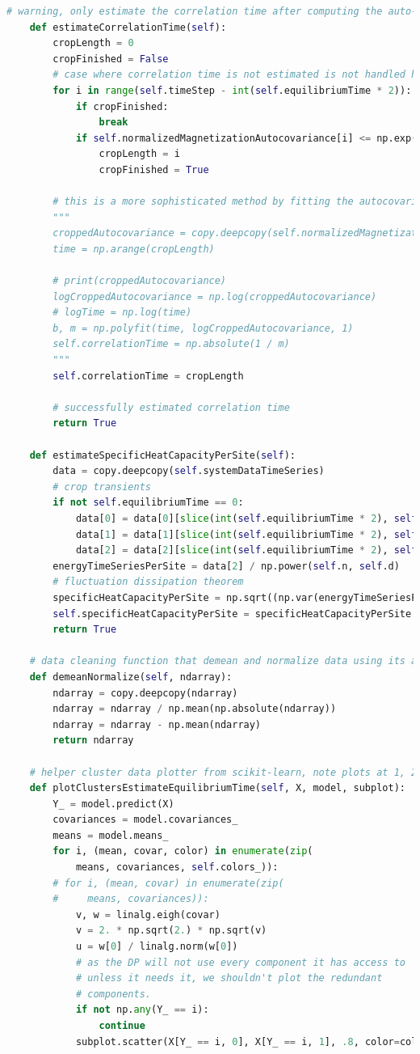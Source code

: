 \documentclass[%
showkeys,
bibnotes,
amsmath,amssymb,
floatfix,
]{revtex4-1}
\begin{document}
\begin{lstlisting}[language=Python]
    # warning, only estimate the correlation time after computing the auto-covariance time series
    def estimateCorrelationTime(self):
        cropLength = 0
        cropFinished = False
        # case where correlation time is not estimated is not handled here
        for i in range(self.timeStep - int(self.equilibriumTime * 2)):
            if cropFinished:
                break
            if self.normalizedMagnetizationAutocovariance[i] <= np.exp(-2.0):
                cropLength = i
                cropFinished = True

        # this is a more sophisticated method by fitting the autocovariance curve
        """
        croppedAutocovariance = copy.deepcopy(self.normalizedMagnetizationAutocovariance[:cropLength])
        time = np.arange(cropLength)

        # print(croppedAutocovariance)
        logCroppedAutocovariance = np.log(croppedAutocovariance)
        # logTime = np.log(time)
        b, m = np.polyfit(time, logCroppedAutocovariance, 1)
        self.correlationTime = np.absolute(1 / m)
        """
        self.correlationTime = cropLength

        # successfully estimated correlation time
        return True

    def estimateSpecificHeatCapacityPerSite(self):
        data = copy.deepcopy(self.systemDataTimeSeries)
        # crop transients
        if not self.equilibriumTime == 0:
            data[0] = data[0][slice(int(self.equilibriumTime * 2), self.timeStep)]
            data[1] = data[1][slice(int(self.equilibriumTime * 2), self.timeStep)]
            data[2] = data[2][slice(int(self.equilibriumTime * 2), self.timeStep)]
        energyTimeSeriesPerSite = data[2] / np.power(self.n, self.d)
        # fluctuation dissipation theorem
        specificHeatCapacityPerSite = np.sqrt((np.var(energyTimeSeriesPerSite))/(self.k * self.t**2))
        self.specificHeatCapacityPerSite = specificHeatCapacityPerSite
        return True

    # data cleaning function that demean and normalize data using its absolute magnitude
    def demeanNormalize(self, ndarray):
        ndarray = copy.deepcopy(ndarray)
        ndarray = ndarray / np.mean(np.absolute(ndarray))
        ndarray = ndarray - np.mean(ndarray)
        return ndarray

    # helper cluster data plotter from scikit-learn, note plots at 1, 2, n sub graph for comparison with the original
    def plotClustersEstimateEquilibriumTime(self, X, model, subplot):
        Y_ = model.predict(X)
        covariances = model.covariances_
        means = model.means_
        for i, (mean, covar, color) in enumerate(zip(
            means, covariances, self.colors_)):
        # for i, (mean, covar) in enumerate(zip(
        #     means, covariances)):
            v, w = linalg.eigh(covar)
            v = 2. * np.sqrt(2.) * np.sqrt(v)
            u = w[0] / linalg.norm(w[0])
            # as the DP will not use every component it has access to
            # unless it needs it, we shouldn't plot the redundant
            # components.
            if not np.any(Y_ == i):
                continue
            subplot.scatter(X[Y_ == i, 0], X[Y_ == i, 1], .8, color=color)


\end{lstlisting}
\end{document}
